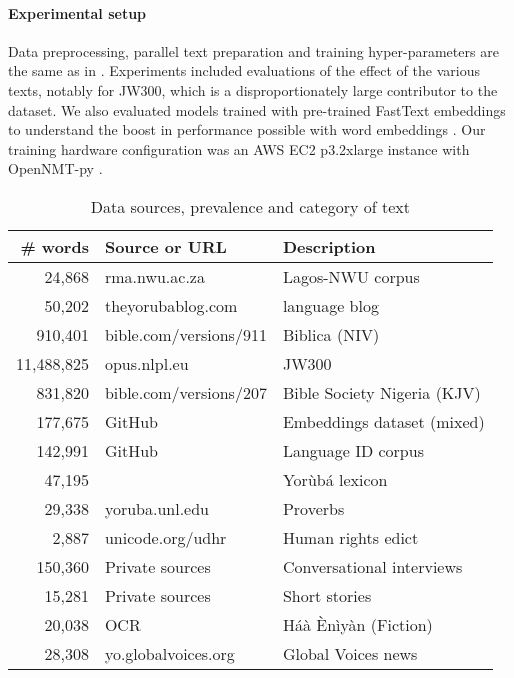 \documentclass{article} %
\begin{document}
\paragraph{Experimental setup}\label{sec:experimental}
Data preprocessing, parallel text preparation and training hyper-parameters are the same as in \citep{orife2018adr}. Experiments included evaluations of the effect of the various texts, notably for JW300, which is a disproportionately large contributor to the dataset. We also evaluated models trained with pre-trained FastText embeddings to understand the boost in performance possible with word embeddings \citep{alabi2019massive, bojanowski2017enriching}. Our training hardware configuration was an AWS EC2 p3.2xlarge instance with OpenNMT-py \citep{opennmt}.

 \begin{table}[h]
  \caption{Data sources, prevalence and category of text}
  \label{tab:training_datasets}
  \begin{center}
  \begin{tabular}{rll}
    \toprule
    \textbf{\# words} & \textbf{Source or URL}  & \textbf{Description} \\
    \midrule
    24,868 & rma.nwu.ac.za  & Lagos-NWU corpus \\  
    50,202 & theyorubablog.com & language blog\\  
    910,401 & bible.com/versions/911 & Biblica (NIV) \\
    \midrule
    11,488,825 & opus.nlpl.eu & JW300 \\
    831,820 & bible.com/versions/207 & Bible Society Nigeria (KJV)\\
    177,675 & GitHub & Embeddings dataset (mixed) \\
    142,991 & GitHub & Language ID corpus \\
    47,195 &  & Yor{\`u}b{\'a} lexicon \\
    29,338 & yoruba.unl.edu & Proverbs \\
    2,887 & unicode.org/udhr & Human rights edict \\
    \midrule
    150,360 & Private sources & Conversational interviews \\
    15,281 & Private sources & Short stories \\
    20,038 & OCR & H{\'a}{\`a} {\`E}n{\`i}y{\`a}n (Fiction)\\
    \midrule
    \midrule
    28,308 & yo.globalvoices.org & Global Voices news \\

    \bottomrule
  \end{tabular}
  \end{center}
\end{table}
\end{document}
